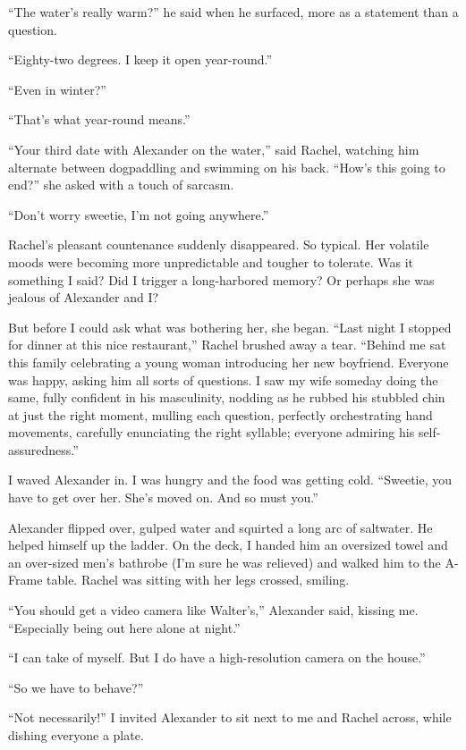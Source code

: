 ``The water's really warm?'' he said when he surfaced, more as a
statement than a question.

``Eighty-two degrees. I keep it open year-round.''

``Even in winter?''

``That's what year-round means.''

``Your third date with Alexander on the water,'' said Rachel, watching
him alternate between dogpaddling and swimming on his back. ``How's this
going to end?'' she asked with a touch of sarcasm.

``Don't worry sweetie, I'm not going anywhere.''

Rachel's pleasant countenance suddenly disappeared. So typical. Her
volatile moods were becoming more unpredictable and tougher to tolerate.
Was it something I said? Did I trigger a long-harbored memory? Or
perhaps she was jealous of Alexander and I?

But before I could ask what was bothering her, she began. ``Last night I
stopped for dinner at this nice restaurant,'' Rachel brushed away a
tear. ``Behind me sat this family celebrating a young woman introducing
her new boyfriend. Everyone was happy, asking him all sorts of
questions. I saw my wife someday doing the same, fully confident in his
masculinity, nodding as he rubbed his stubbled chin at just the right
moment, mulling each question, perfectly orchestrating hand movements,
carefully enunciating the right syllable; everyone admiring his
self-assuredness.''

I waved Alexander in. I was hungry and the food was getting cold.
``Sweetie, you have to get over her. She's moved on. And so must you.''

Alexander flipped over, gulped water and squirted a long arc of
saltwater. He helped himself up the ladder. On the deck, I handed him an
oversized towel and an over-sized men's bathrobe (I'm sure he was
relieved) and walked him to the A-Frame table. Rachel was sitting with
her legs crossed, smiling.

``You should get a video camera like Walter's,'' Alexander said, kissing
me. ``Especially being out here alone at night.''

``I can take of myself. But I do have a high-resolution camera on the
house.''

``So we have to behave?''

``Not necessarily!'' I invited Alexander to sit next to me and Rachel
across, while dishing everyone a plate.


